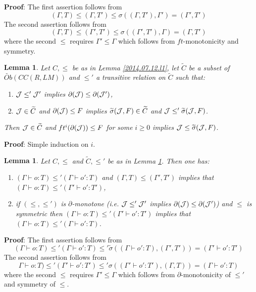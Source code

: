 \documentclass[11pt]{article}
\newenvironment{proof}{{\bf Proof}:}{\vskip 5mm }
\newtheorem{lemma}[proposition]{Lemma}
\newcommand{\llabel}[1]{\label{#1}}
\newcommand{\wt}{\widetilde}
\begin{document}
%
\begin{proof}
The first assertion follows from
%
$$(\Gamma,T)\le (\Gamma,T')\le \sigma((\Gamma,T'),\Gamma')=(\Gamma',T')$$
%
The second assertion  follows from
%
$$(\Gamma,T)\le (\Gamma',T')\le \sigma((\Gamma',T'),\Gamma)=(\Gamma,T')$$
%
where the second $\le$ requires $\Gamma'\le \Gamma$ which follows from $ft$-monotonicity and symmetry.
\end{proof}
%
\begin{lemma}
\llabel{2014.07.12.l3}
Let $C,\le$ be as in Lemma \ref{2014.07.12.l1}, let $\wt{C}$ be a subset of $\wt{Ob}(CC(R,LM))$ and $\le'$ a transitive relation on $\wt{C}$ such that: 
%
\begin{enumerate}
\item ${\cal J}\le' {\cal J}'$ implies $\partial({\cal J})\le\partial({\cal J}')$,
\item ${\cal J}\in \wt{C}$ and $\partial({\cal J})\le F$ implies $\wt{\sigma}({\cal J},F)\in \wt{C}$ and ${\cal J}\le' \wt{\sigma}({\cal J},F)$.
\end{enumerate}
%
Then ${\cal J}\in \wt{C}$ and $ft^i(\partial({\cal J}))\le F$ for some $i\ge 0$ implies ${\cal J}\le \wt{\sigma}({\cal J},F)$. 
\end{lemma}
%
\begin{proof}
Simple induction on $i$.
\end{proof}
%
\begin{lemma}
\llabel{2014.07.12.l4}
Let $C,\le$ and $\wt{C},\le'$ be as in Lemma \ref{2014.07.12.l3}. Then one has:
%
\begin{enumerate}
\item $(\Gamma\vdash o:T)\le' (\Gamma\vdash o':T)$ and $(\Gamma,T)\le (\Gamma',T')$ implies that $(\Gamma\vdash o:T)\le' (\Gamma'\vdash o':T')$,
\item if $(\le,\le')$ is $\partial$-monotone (i.e. ${\cal J}\le' {\cal J}'$ implies $\partial({\cal J})\le \partial({\cal J}')$) and $\le$ is symmetric then $(\Gamma\vdash o:T)\le' (\Gamma'\vdash o':T')$ implies that $(\Gamma\vdash o:T)\le' (\Gamma\vdash o':T)$.
\end{enumerate}
\end{lemma}
%
\begin{proof}
The first assertion follows from
%
$$(\Gamma\vdash o:T)\le'  (\Gamma\vdash o':T)\le' \wt{\sigma}((\Gamma\vdash o':T) ,(\Gamma',T'))=(\Gamma'\vdash o':T')$$
%
The second assertion follows from
%
$$\Gamma\vdash o:T)\le' (\Gamma'\vdash o':T')\le' \sigma((\Gamma'\vdash o':T'),(\Gamma,T))=(\Gamma\vdash o':T)$$
%
where the second $\le$ requires $\Gamma'\le \Gamma$ which follows from $\partial$-monotonicity of $\le'$ and symmetry of $\le$.
\end{proof}
%
\end{document}
